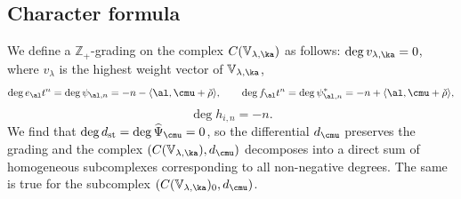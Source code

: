 \documentclass{amsart}
\newcommand{\wh}{\widehat}
\newcommand{\bra}{{\langle}}
\newcommand{\ket}{{\rangle}}
\newcommand{\on}{\operatorname}
\newcommand{\+}{\mathop{\oplus}}
\renewcommand{\*}{{\otimes}}
\newcommand{\mb}{\mathbb}
\newcommand{\Z}{\mathbb{Z}}
\newcommand{\C}{\mathbb{C}}
\newcommand{\lam}{\lambda}
\def\leq{\leqslant}
\def\geq{\geqslant}
\theoremstyle{theorem}
\theoremstyle{remark}
\numberwithin{equation}{section}
\begin{document}


\subsection{Character formula}    \label{char form}

We define a $\Z_+$-grading on the complex $C({\mb V}_{\lam,\ka})$ as
follows: $\on{deg} v_{\lam,\ka} = 0$, where $v_\lam$ is the highest
weight vector of ${\mb V}_{\lam,\ka}$,
$$
\on{deg} e_\al t^n = \on{deg} \psi_{\al,n} = -n -
\bra\al,\cmu+\check\rho \ket, \qquad \on{deg} f_\al t^n = \on{deg}
\psi^*_{\al,n} = -n + \bra\al,\cmu+\check\rho \ket,
$$
$$
\on{deg} h_{i,n} = -n.
$$
We find that $\on{deg} d_{\on{st}} = \on{deg} \wh\Psi_\cmu = 0$, so
the differential $d_\cmu$ preserves the grading and the complex
$(C({\mb V}_{\lam,\ka}),d_\cmu)$ decomposes into a direct sum of
homogeneous subcomplexes corresponding to all non-negative
degrees. The same is true for the subcomplex $(C({\mb
  V}_{\lam,\ka})_0,d_\cmu)$.
\end{document}
